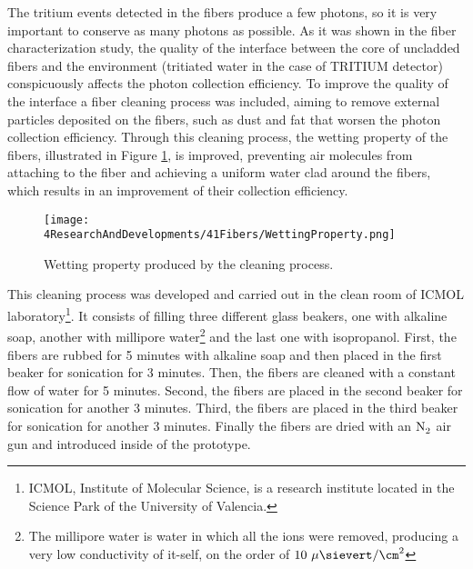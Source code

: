 
The tritium events detected in the fibers produce a few photons, so it is very important to conserve as many photons as possible. As it was shown in the fiber characterization study, the quality of the interface between the core of uncladded fibers and the environment (tritiated water in the case of TRITIUM detector) conspicuously affects the photon collection efficiency. To improve the quality of the interface a fiber cleaning process was included, aiming to remove external particles deposited on the fibers, such as dust and fat that worsen the photon collection efficiency.  Through this cleaning process, the wetting property of the fibers, illustrated in Figure \ref{fig:WettingProperty}, is improved, preventing air molecules from attaching to the fiber and achieving a uniform water clad around the fibers, which results in an improvement of their collection efficiency. 


\begin{figure}[h]
\centering
\texttt{[image: 4ResearchAndDevelopments/41Fibers/WettingProperty.png]}
\caption{Wetting property produced by the cleaning process. \cite{WettingProperty}\label{fig:WettingProperty}}
\end{figure}


This cleaning process  was developed and carried out in the clean room of ICMOL laboratory\footnote{ICMOL, Institute of Molecular Science, is a research institute located in the Science Park of the University of Valencia.}. It consists of filling three different glass beakers, one with alkaline soap, another with millipore water\footnote{The millipore water is water in which all the ions were removed, producing a very low conductivity of it-self, on the order of $10~\mu\sievert/\cm^2$} and the last one with isopropanol. First, the fibers are rubbed for 5 minutes with alkaline soap and then placed in the first beaker for sonication for 3 minutes. Then, the fibers are cleaned with a constant flow of water for 5 minutes. Second, the fibers are placed in the second beaker for sonication for another 3 minutes. Third, the fibers are placed in the third beaker for sonication for another 3 minutes. Finally the fibers are dried with an $\ce{N_2}$ air gun and introduced inside of the prototype.

